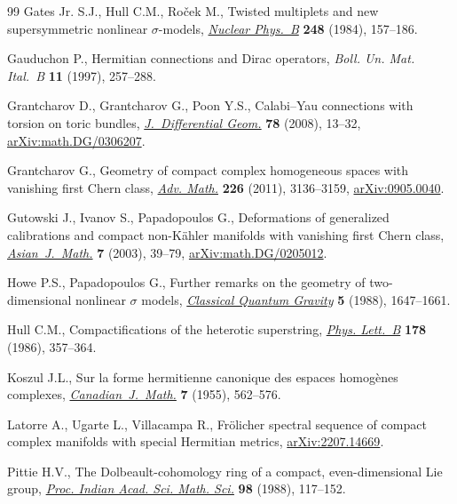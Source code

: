 \documentclass[10pt,a4paper]{amsart}
\numberwithin{equation}{section}
\begin{document}
\begin{thebibliography}{99}
Gates Jr. S.J., Hull C.M., Ro\v{c}ek M., Twisted multiplets and new
 supersymmetric nonlinear {$\sigma$}-models, \href{https://doi.org/10.1016/0550-3213(84)90592-3}{\textit{Nuclear Phys.~B}}
 \textbf{248} (1984), 157--186.

Gauduchon P., Hermitian connections and {D}irac operators, \textit{Boll. Un.
 Mat. Ital.~B} \textbf{11} (1997), 257--288.

Grantcharov D., Grantcharov G., Poon Y.S., Calabi--{Y}au connections with
 torsion on toric bundles, \href{https://doi.org/10.4310/jdg/1197320602}{\textit{J.~Differential Geom.}} \textbf{78} (2008),
 13--32, \href{https://arxiv.org/abs/math.DG/0306207}{arXiv:math.DG/0306207}.

Grantcharov G., Geometry of compact complex homogeneous spaces with vanishing
 first {C}hern class, \href{https://doi.org/10.1016/j.aim.2010.10.005}{\textit{Adv. Math.}} \textbf{226} (2011), 3136--3159,
 \href{https://arxiv.org/abs/0905.0040}{arXiv:0905.0040}.

Gutowski J., Ivanov S., Papadopoulos G., Deformations of generalized
 calibrations and compact non-{K}\"ahler manifolds with vanishing first
 {C}hern class, \href{https://doi.org/10.4310/AJM.2003.v7.n1.a4}{\textit{Asian~J.~Math.}} \textbf{7} (2003), 39--79,
 \href{https://arxiv.org/abs/math.DG/0205012}{arXiv:math.DG/0205012}.

Howe P.S., Papadopoulos G., Further remarks on the geometry of two-dimensional
 nonlinear {$\sigma$} models, \href{https://doi.org/10.1088/0264-9381/5/12/014}{\textit{Classical Quantum Gravity}} \textbf{5}
 (1988), 1647--1661.

Hull C.M., Compactifications of the heterotic superstring, \href{https://doi.org/10.1016/0370-2693(86)91393-6}{\textit{Phys.
 Lett.~B}} \textbf{178} (1986), 357--364.

Koszul J.L., Sur la forme hermitienne canonique des espaces homog\`enes
 complexes, \href{https://doi.org/10.4153/CJM-1955-061-3}{\textit{Canadian~J.~Math.}} \textbf{7} (1955), 562--576.

Latorre A., Ugarte L., Villacampa R., Fr\"olicher spectral sequence of compact
 complex manifolds with special {H}ermitian metrics, \href{https://arxiv.org/abs/2207.14669}{arXiv:2207.14669}.

Pittie H.V., The {D}olbeault-cohomology ring of a compact, even-dimensional
 {L}ie group, \href{https://doi.org/10.1007/BF02863632}{\textit{Proc. Indian Acad. Sci. Math. Sci.}} \textbf{98} (1988),
 117--152.


\end{thebibliography}
\end{document}
